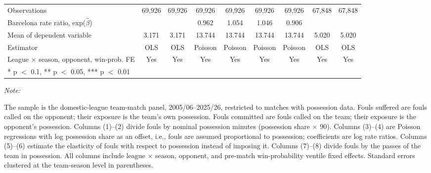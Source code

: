 \begin{table}[!h]
{\begin{threeparttable}
\begin{tabular}[t]{lcccccccc}
\midrule
Observations & 69,926 & 69,926 & 69,926 & 69,926 & 69,926 & 69,926 & 67,848 & 67,848\\
Barcelona rate ratio, exp($\hat\beta$) &  &  & 0.962 & 1.054 & 1.046 & 0.906 &  & \\
Mean of dependent variable & 3.171 & 3.171 & 13.744 & 13.744 & 13.744 & 13.744 & 5.020 & 5.020\\
Estimator & OLS & OLS & Poisson & Poisson & Poisson & Poisson & OLS & OLS\\
League $\times$ season, opponent, win-prob. FE & Yes & Yes & Yes & Yes & Yes & Yes & Yes & Yes\\
\bottomrule
\multicolumn{9}{l}{\rule{0pt}{1em}* p $<$ 0.1, ** p $<$ 0.05, *** p $<$ 0.01}\\
\end{tabular}
\begin{tablenotes}[para]
\item \textit{Note: } 
\item The sample is the domestic-league team-match panel, 2005/06--2025/26, restricted to matches with possession data. Fouls suffered are fouls called on the opponent; their exposure is the team's own possession. Fouls committed are fouls called on the team; their exposure is the opponent's possession. Columns (1)--(2) divide fouls by nominal possession minutes (possession share $\times$ 90). Columns (3)--(4) are Poisson regressions with log possession share as an offset, i.e., fouls are assumed proportional to possession; coefficients are log rate ratios. Columns (5)--(6) estimate the elasticity of fouls with respect to possession instead of imposing it. Columns (7)--(8) divide fouls by the passes of the team in possession. All columns include league $\times$ season, opponent, and pre-match win-probability ventile fixed effects. Standard errors clustered at the team-season level in parentheses.
\end{tablenotes}
\end{threeparttable}}
\end{table}
